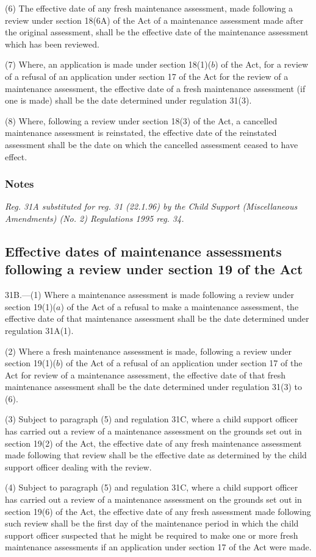 \documentclass[a4paper]{article}
\newcommand\amendment[1]{\subsubsection*{Notes}{\itshape\frenchspacing\footnotesize #1 \par}}
\begin{document}
(6) The effective date of any fresh maintenance assessment, made following a review under section 18(6A) of the Act of a maintenance assessment made after the original assessment, shall be the effective date of the maintenance assessment which has been reviewed.

(7) Where, an application is made under section 18(1)($b$) of the Act, for a review of a refusal of an application under section 17 of the Act for the review of a maintenance assessment, the effective date of a fresh maintenance assessment (if one is made) shall be the date determined under regulation 31(3).

(8) Where, following a review under section 18(3) of the Act, a cancelled maintenance assessment is reinstated, the effective date of the reinstated assessment shall be the date on which the cancelled assessment ceased to have effect.

\amendment{
Reg. 31A substituted for reg. 31 (22.1.96) by the Child Support (Miscellaneous Amendments) (No. 2) Regulations 1995 reg. 34.
}

\subsection[31B. Effective dates of maintenance assessments following a review under section 19 of the Act]{Effective dates of maintenance assessments following a review under section 19 of the Act}

31B.—(1) Where a maintenance assessment is made following a review under section 19(1)($a$) of the Act of a refusal to make a maintenance assessment, the effective date of that maintenance assessment shall be the date determined under regulation 31A(1).

(2) Where a fresh maintenance assessment is made, following a review under section 19(1)($b$) of the Act of a refusal of an application under section 17 of the Act for review of a maintenance assessment, the effective date of that fresh maintenance assessment shall be the date determined under regulation 31(3) to (6).

(3) Subject to paragraph (5) and regulation 31C, where a child support officer has carried out a review of a maintenance assessment on the grounds set out in section 19(2) of the Act, the effective date of any fresh maintenance assessment made following that review shall be the effective date as determined by the child support officer dealing with the review.

(4) Subject to paragraph (5) and regulation 31C, where a child support officer has carried out a review of a maintenance assessment on the grounds set out in section 19(6) of the Act, the effective date of any fresh assessment made following such review shall be the first day of the maintenance period in which the child support officer suspected that he might be required to make one or more fresh maintenance assessments if an application under section 17 of the Act were made.
\end{document}
